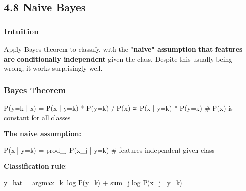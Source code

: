 \documentclass[11pt]{article}
\newenvironment{Shaded}{\begin{snugshade}}{\end{snugshade}}
\newcommand{\CommentTok}[1]{\textcolor[rgb]{0.48,0.49,0.49}{#1}}
\newcommand{\NormalTok}[1]{\textcolor[rgb]{0.81,0.81,0.76}{#1}}
\newcommand{\OperatorTok}[1]{\textcolor[rgb]{0.81,0.81,0.76}{#1}}
\begin{document}
\subsection{4.8 Naive Bayes}\label{48-naive-bayes}

\subsubsection{Intuition}\label{intuition-7}

Apply Bayes\textquotesingle{} theorem to classify, with the \textbf{"naive" assumption that features are conditionally independent} given the class. Despite this usually being wrong, it works surprisingly well.

\subsubsection{Bayes\textquotesingle{} Theorem}\label{bayes-theorem}


\begin{Shaded}
\begin{Highlighting}[]
\NormalTok{P(y}\OperatorTok{=}\NormalTok{k }\OperatorTok{|}\NormalTok{ x) }\OperatorTok{=}\NormalTok{ P(x }\OperatorTok{|}\NormalTok{ y}\OperatorTok{=}\NormalTok{k) }\OperatorTok{*}\NormalTok{ P(y}\OperatorTok{=}\NormalTok{k) }\OperatorTok{/}\NormalTok{ P(x)}
\NormalTok{           ∝ P(x }\OperatorTok{|}\NormalTok{ y}\OperatorTok{=}\NormalTok{k) }\OperatorTok{*}\NormalTok{ P(y}\OperatorTok{=}\NormalTok{k)          }\CommentTok{\# P(x) is constant for all classes}
\end{Highlighting}
\end{Shaded}

\textbf{The naive assumption:}


\begin{Shaded}
\begin{Highlighting}[]
\NormalTok{P(x }\OperatorTok{|}\NormalTok{ y}\OperatorTok{=}\NormalTok{k) }\OperatorTok{=}\NormalTok{ prod\_j P(x\_j }\OperatorTok{|}\NormalTok{ y}\OperatorTok{=}\NormalTok{k)         }\CommentTok{\# features independent given class}
\end{Highlighting}
\end{Shaded}

\textbf{Classification rule:}


\begin{Shaded}
\begin{Highlighting}[]
\NormalTok{y\_hat }\OperatorTok{=}\NormalTok{ argmax\_k [log P(y}\OperatorTok{=}\NormalTok{k) }\OperatorTok{+}\NormalTok{ sum\_j log P(x\_j }\OperatorTok{|}\NormalTok{ y}\OperatorTok{=}\NormalTok{k)]}
\end{Highlighting}
\end{Shaded}
\end{document}
